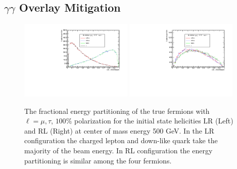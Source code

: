 \subsection{$\gamma\gamma$ Overlay Mitigation}
\label{subsec:Pileup_mitigation}
\begin{figure}

\includegraphics[width=0.48\textwidth]{hxLR.pdf}
\includegraphics[width=0.48\textwidth]{hxRL.pdf}
\caption{The fractional energy partitioning of the true fermions with $\ell = \mu,\tau$, $100\%$ polarization for the initial state helicities LR (Left) and RL (Right) at center of mass energy 500 GeV. In the LR configuration the charged lepton and down-like quark take the majority of the beam energy. In RL configuration the energy partitioning is similar among the four fermions. }
\label{fig:Epartition}
\end{figure}

